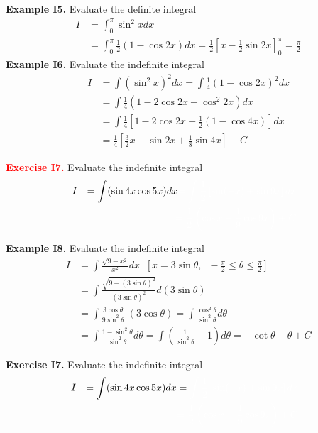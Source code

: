 \documentclass{article}
\begin{document}
\textbf{Example I5.} Evaluate  the definite integral
\begin{eqnarray}
& I & =\int_0^{\pi} \sin^2 x  dx  \nonumber \\
&   & =\int_0^{\pi} \frac{1}{2} \left( 1 - \cos 2x \right)  dx  = \frac{1}{2} \left[ x - \frac{1}{2}\sin 2x \right]_0^{\pi}
= \frac{\pi}{2}   \nonumber
\end{eqnarray}
\textbf{Example I6.}
Evaluate the indefinite integral
\begin{eqnarray}
& I & =\int  (\sin^2 x)^2  dx  = \int \frac{1}{4} \left( 1 - \cos 2x \right)^2  dx  \nonumber \\
&   & =\int \frac{1}{4} \left( 1 - 2\cos 2x +\cos^2 2x
\right)  dx
\nonumber \\
&   & =\int \frac{1}{4} \left[  1 - 2\cos 2x +
\frac{1}{2} \left( 1 - \cos 4x \right) \right]  dx  \nonumber \\
&   & = \frac{1}{4} \left[ \frac{3}{2} x -\sin 2x + \frac{1}{8}
\sin 4x \right]  +C    \nonumber
\end{eqnarray}


\textcolor{red}{\textbf{Exercise I7.}}
Evaluate  the indefinite integral
\begin{eqnarray}
& I & =\int  (\sin4x \cos 5x )  dx  \textcolor{white}{=\int \frac{1}{2} \left[ \sin (-x) +\sin 9x \right]  dx  }\nonumber \\
&   & \textcolor{white}{=\frac{1}{2} \left( \cos x  - \frac{1}{9} \cos 9x \right) +C}
\nonumber
\end{eqnarray}
\vspace{100px}

\textbf{Example I8.}
Evaluate  the indefinite integral
\begin{eqnarray}
& I & =\int  \frac{\sqrt{9-x^2}}{x^2}  dx \; \;
[x=3\sin \theta, \;\; -\frac{\pi}{2} \leq \theta \leq \frac{\pi}{2}] \nonumber \\
&   & =\int  \frac{\sqrt{9-(3\sin \theta)^2} }{(3\sin \theta)^2}  d (3\sin \theta)  \nonumber \\
&   & = \int  \frac{3\cos \theta  }{9\sin^2 \theta } \; (3\cos
\theta) = \int  \frac{\cos^2  \theta  }{\sin^2 \theta } d \theta  \nonumber \\
& & =  \int  \frac{1- \sin^2  \theta  }{\sin^2 \theta } d \theta  = \int \left(  \frac{1 }{\sin^2 \theta } -1 \right) d \theta  \nonumber =  -\cot \theta -\theta +C  \nonumber
\end{eqnarray}


\textbf{Exercise I7.}
Evaluate  the indefinite integral
\begin{eqnarray}
& I & =\int  (\sin4x \cos 5x )  dx  =\textcolor{white}{\int \frac{1}{2} \left[ \sin (-x) +\sin 9x \right]  dx  }\nonumber \\
&   & \textcolor{white}{=\frac{1}{2} \left( \cos x  - \frac{1}{9} \cos 9x \right) +C}
\nonumber
\end{eqnarray}
\vspace{100px}
\end{document}
